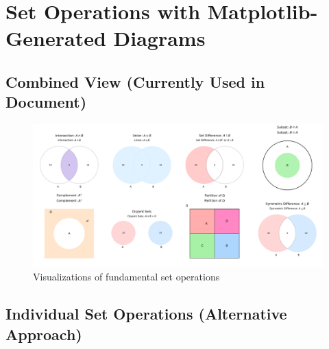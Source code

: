 
\section{Set Operations with Matplotlib-Generated Diagrams}

\subsection{Combined View (Currently Used in Document)}

\begin{figure}[h]
    \centering
    \includegraphics[width=\textwidth]{figures/set_operations/all_operations.png}
    \caption{Visualizations of fundamental set operations}
    \label{fig:set_operations}
\end{figure}

\subsection{Individual Set Operations (Alternative Approach)}


